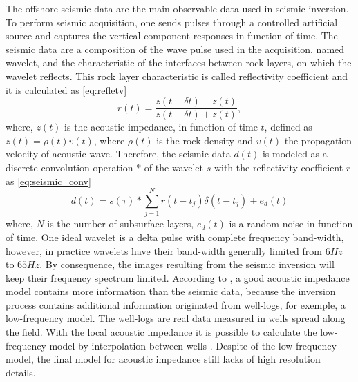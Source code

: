 \documentclass[conference]{IEEEtran}
\begin{document}
The offshore seismic data are the main observable data used in seismic inversion. To perform seismic acquisition,
one sends pulses through a controlled artificial source and captures
the vertical component responses in function of time. The seismic data are a composition of
the wave pulse used in the acquisition, named wavelet, and the characteristic of the interfaces between rock layers,
on which the wavelet reflects. This rock layer characteristic is called reflectivity coefficient and it is
calculated as \eqref{eq:refletv}
\begin{equation}
r(t) = \frac{z(t+\delta t)-z(t)}{z(t+\delta t)+z(t)},
\label{eq:refletv}
\end{equation}
where, $z(t)$ is the acoustic impedance, in function of time $t$, defined as 
$z(t)=\rho(t)v(t)$, where $\rho(t)$ is the rock density and $v(t)$ the propagation velocity
of acoustic wave.
Therefore, the seismic data  $d(t)$ is modeled as a discrete convolution operation $*$ of the wavelet $s$ with the
reflectivity coefficient $r$ as \eqref{eq:seismic_conv}
\begin{equation}
d(t) = s(\tau) * \sum_{j-1}^{N}{r(t- t_j) \delta(t - t_j) + e_d(t)}
\label{eq:seismic_conv}
\end{equation}
where, $N$ is the number of subsurface layers, $e_d(t)$ is a random noise in function of time.
One ideal wavelet is a delta pulse with complete frequency band-width, however, in practice
wavelets have their band-width generally limited from $6Hz$ to $65Hz$. By consequence,
the images resulting from the seismic inversion will keep their frequency spectrum limited.
According to \cite{Latimer2017}, a good acoustic impedance model contains more information
than the seismic data, because the inversion process contains additional information originated from well-logs, for
exemple, a low-frequency model.
The well-logs are real data measured in wells spread along the field.
With the local acoustic impedance it is possible to calculate the low-frequency
model by interpolation between wells \cite{Buland2003,Figueiredo2012}. Despite of the
low-frequency model, the final model for acoustic impedance still lacks of high resolution details.
\end{document}
